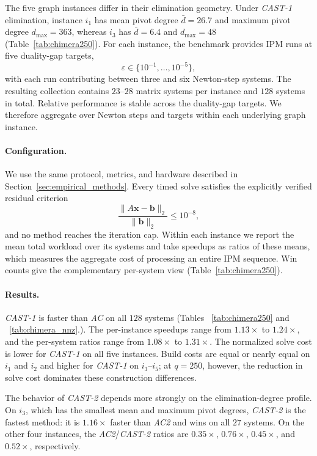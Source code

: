 \documentclass{article}
\newcommand{\CASTone}{\textit{CAST-1}\xspace}
\newcommand{\CASTtwo}{\textit{CAST-2}\xspace}
\newcommand{\AC}{\textit{AC}\xspace}
\newcommand{\ACtwo}{\textit{AC2}\xspace}
\newcommand{\1}{\mathbbm{1}}
\theoremstyle{plain}
\begin{document}
The five graph instances differ  in their elimination
geometry. Under \CASTone elimination, instance $i_1$ has mean pivot
degree $\bar d=26.7$ and maximum pivot degree
$d_{\max}=363$, whereas $i_3$ has
$\bar d=6.4$ and $d_{\max}=48$
(Table~\ref{tab:chimera250}). For each instance, the benchmark
provides IPM runs at five duality-gap targets,
\[
\varepsilon\in\{10^{-1},\ldots,10^{-5}\},
\]
with each run contributing between three and six Newton-step systems. The resulting collection contains $23$--$28$ matrix systems per instance and $128$ systems in total. Relative performance is stable across the duality-gap targets. We therefore aggregate over Newton steps and targets within each underlying graph instance.

\paragraph{Configuration.}
We use the same protocol, metrics, and hardware described in
Section~\ref{sec:empirical_methods}. Every timed solve satisfies the
explicitly verified residual criterion
\[
\frac{\lVert A\mathbf{x}-\mathbf{b}\rVert_2}
     {\lVert\mathbf{b}\rVert_2}
\leq 10^{-8},
\]
and no method reaches the iteration cap. Within each instance we report the mean total workload over its
systems and take speedups as ratios of these means, which measures
the aggregate cost of processing an entire IPM sequence. Win counts
give the complementary per-system view (Table~\ref{tab:chimera250}).

\paragraph{Results.}
\CASTone is faster than \AC on all $128$ systems (Tables ~\ref{tab:chimera250} and ~\ref{tab:chimera_nnz}.). The per-instance speedups range from $1.13\times$ to $1.24\times$,
and the per-system ratios range from $1.08\times$ to $1.31\times$.
The normalized solve cost is lower for \CASTone on all five
instances. Build costs are equal or nearly equal on $i_1$ and $i_2$
and higher for \CASTone on $i_3$--$i_5$; at $q=250$, however, the
reduction in solve cost dominates these construction differences.

The behavior of \CASTtwo depends more strongly on the
elimination-degree profile. On $i_3$, which has the smallest mean and
maximum pivot degrees, \CASTtwo is the fastest method: it is
$1.16\times$ faster than \ACtwo and wins on all $27$ systems. On
the other four instances, the \ACtwo/\CASTtwo ratios are
$0.35\times$, $0.76\times$, $0.45\times$, and $0.52\times$,
respectively.
\end{document}
